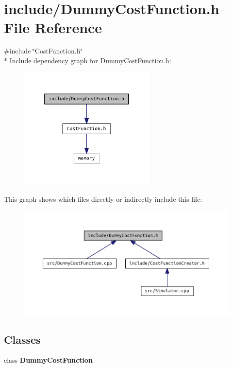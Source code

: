 \section{include/\+Dummy\+Cost\+Function.h File Reference}
\label{_dummy_cost_function_8h}
{\ttfamily \#include \char`\"{}Cost\+Function.\+h\char`\"{}}\\*
Include dependency graph for Dummy\+Cost\+Function.\+h\+:
\nopagebreak
\begin{figure}[H]
\begin{center}
\leavevmode
\includegraphics[width=196pt]{_dummy_cost_function_8h__incl}
\end{center}
\end{figure}
This graph shows which files directly or indirectly include this file\+:
\nopagebreak
\begin{figure}[H]
\begin{center}
\leavevmode
\includegraphics[width=350pt]{_dummy_cost_function_8h__dep__incl}
\end{center}
\end{figure}
\subsection*{Classes}
\begin{DoxyCompactItemize}
\item 
class {\bf Dummy\+Cost\+Function}
\end{DoxyCompactItemize}
